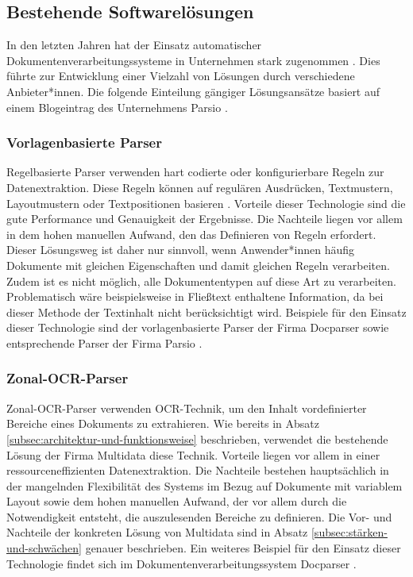 \subsection{Bestehende Softwarelösungen}
\label{subsec:bestehende-softwarelösungen}

In den letzten Jahren hat der Einsatz automatischer Dokumentenverarbeitungssysteme in Unternehmen stark zugenommen \parencite{PerotVincent2024LLMD}. Dies führte zur Entwicklung einer Vielzahl von Lösungen durch verschiedene Anbieter*innen. Die folgende Einteilung gängiger Lösungsansätze basiert auf einem Blogeintrag des Unternehmens Parsio \parencite{parsio_pdf_extraction}.

\subsubsection{Vorlagenbasierte Parser}
\label{subsubsec:regelbasierte-ansätze}

Regelbasierte Parser verwenden hart codierte oder konfigurierbare Regeln zur Datenextraktion. Diese Regeln können auf regulären Ausdrücken, Textmustern, Layoutmustern oder Textpositionen basieren \parencite{docparser_ruleBasedParsing}. Vorteile dieser Technologie sind die gute Performance und Genauigkeit der Ergebnisse. Die Nachteile liegen vor allem in dem hohen manuellen Aufwand, den das Definieren von Regeln erfordert. Dieser Lösungsweg ist daher nur sinnvoll, wenn Anwender*innen häufig Dokumente mit gleichen Eigenschaften und damit gleichen Regeln verarbeiten. Zudem ist es nicht möglich, alle Dokumententypen auf diese Art zu verarbeiten. Problematisch wäre beispielsweise in Fließtext enthaltene Information, da bei dieser Methode der Textinhalt nicht berücksichtigt wird. Beispiele für den Einsatz dieser Technologie sind der vorlagenbasierte Parser der Firma Docparser \parencite{docparser_ruleBasedParsing} sowie entsprechende Parser der Firma Parsio \parencite{parsio_pdf_extraction}.

\subsubsection{Zonal-OCR-Parser}
\label{subsubsec:zonal-ocr-parser}

Zonal-\gls{OCR}-Parser verwenden \gls{OCR}-Technik, um den Inhalt vordefinierter Bereiche eines Dokuments zu extrahieren. Wie bereits in Absatz \ref{subsec:architektur-und-funktionsweise} beschrieben, verwendet die bestehende Lösung der Firma Multidata diese Technik. Vorteile liegen vor allem in einer ressourceneffizienten Datenextraktion. Die Nachteile bestehen hauptsächlich in der mangelnden Flexibilität des Systems im Bezug auf Dokumente mit variablem Layout sowie dem hohen manuellen Aufwand, der vor allem durch die Notwendigkeit entsteht, die auszulesenden Bereiche zu definieren. Die Vor- und Nachteile der konkreten Lösung von Multidata sind in Absatz \ref{subsec:stärken-und-schwächen} genauer beschrieben. Ein weiteres Beispiel für den Einsatz dieser Technologie findet sich im Dokumentenverarbeitungssystem Docparser \parencite{docparser_zonalOCR}.

